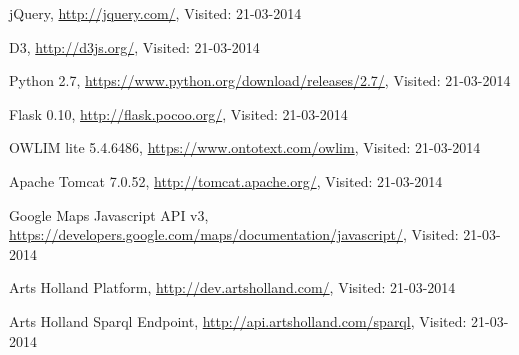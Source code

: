 \begin{thebibliography}{99}
	jQuery,
    \url{http://jquery.com/},
    Visited: 21-03-2014

	D3,
    \url{http://d3js.org/},
    Visited: 21-03-2014

	Python 2.7,
    \url{https://www.python.org/download/releases/2.7/},
    Visited: 21-03-2014
    
	Flask 0.10,
    \url{http://flask.pocoo.org/},
    Visited: 21-03-2014
   
	OWLIM lite 5.4.6486,
    \url{https://www.ontotext.com/owlim},
    Visited: 21-03-2014 

	Apache Tomcat 7.0.52,
    \url{http://tomcat.apache.org/},
    Visited: 21-03-2014 

	Google Maps Javascript API v3,
    \url{https://developers.google.com/maps/documentation/javascript/},
    Visited: 21-03-2014

	Arts Holland Platform,
    \url{http://dev.artsholland.com/},
    Visited: 21-03-2014
    
	Arts Holland Sparql Endpoint,
    \url{http://api.artsholland.com/sparql},
    Visited: 21-03-2014
    
\end{thebibliography}



\endgroup